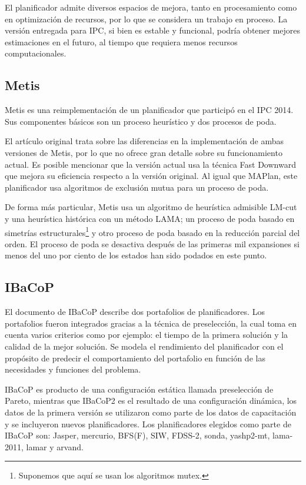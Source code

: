 \documentclass[a4paper,12pt,twocolumn]{article}
\begin{document}
El planificador admite diversos espacios de mejora, tanto en procesamiento como en optimización de recursos, por lo que se considera un trabajo en proceso. La versión entregada para IPC, si bien es estable y funcional, podría obtener mejores estimaciones en el futuro, al tiempo que requiera menos recursos computacionales.

\subsection{Metis}

Metis\citep{sievers2018metis} es una reimplementación de un planificador que participó en el IPC 2014. Sus componentes básicos son un proceso heurístico y dos procesos de poda.

El artículo original trata sobre las diferencias en la implementación de ambas versiones de Metis, por lo que no ofrece gran detalle sobre su funcionamiento actual. Es posible mencionar que la versión actual usa la técnica Fast Downward que mejora su eficiencia respecto a la versión original. Al igual que MAPlan, este planificador usa algoritmos de exclusión mutua para un proceso de poda.

De forma más particular, Metis  usa un algoritmo de heurística admisible LM-cut y una heurística histórica con un método LAMA; un proceso de poda basado en simetrías estructurales\footnote{Suponemos que aquí se usan los algoritmos mutex.} y otro proceso de poda basado en la reducción parcial del orden. El proceso de poda se desactiva después de las primeras mil expansiones si menos del uno por ciento de los estados han sido podados en este punto.

\subsection{IBaCoP}

El documento de IBaCoP\citep{cenamor2018ibacop} describe dos portafolios de planificadores. Los portafolios fueron integrados gracias a la técnica de preselección, la cual toma en cuenta varios criterios como por ejemplo: el tiempo de la primera solución y la calidad de la mejor solución. Se modela el rendimiento del planificador con el propósito de predecir el comportamiento del portafolio en función de las necesidades y funciones del problema.

IBaCoP es producto de una configuración estática llamada preselección de Pareto, mientras que IBaCoP2 es el resultado de una configuración dinámica, los datos de la primera versión se utilizaron como parte de los datos de capacitación y se incluyeron nuevos planificadores. Los planificadores elegidos como parte de IBaCoP son: Jasper, mercurio, BFS(F), SIW, FDSS-2, sonda, yashp2-mt, lama-2011, lamar y arvand.
\end{document}

